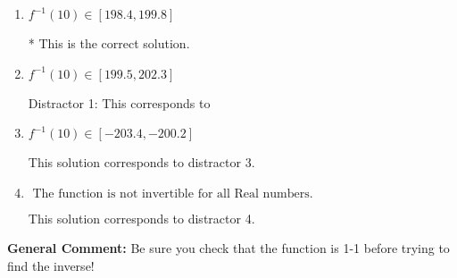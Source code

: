 \documentclass{extbook}[14pt]
\begin{document}
\begin{enumerate}
{\begin{enumerate}[label=\Alph*.]
 This solution corresponds to distractor 2.
\item \( f^{-1}(10) \in [198.4, 199.8] \)

* This is the correct solution.
\item \( f^{-1}(10) \in [199.5, 202.3] \)

 Distractor 1: This corresponds to 
\item \( f^{-1}(10) \in [-203.4, -200.2] \)

 This solution corresponds to distractor 3.
\item \( \text{ The function is not invertible for all Real numbers. } \)

 This solution corresponds to distractor 4.
\end{enumerate}

\textbf{General Comment:} Be sure you check that the function is 1-1 before trying to find the inverse!
}
\end{enumerate}
\end{document}
